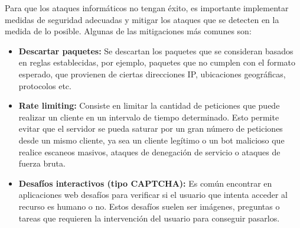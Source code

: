 Para que los ataques informáticos no tengan éxito, es importante implementar medidas de seguridad adecuadas y mitigar los ataques que se detecten en la medida de lo posible. 
Algunas de las mitigaciones más comunes son:
\begin{itemize}
	\item \textbf{Descartar paquetes:} Se descartan los paquetes que se consideran basados en reglas establecidas, por ejemplo, paquetes que no cumplen con el formato esperado, que provienen de ciertas direcciones IP, ubicaciones geográficas, protocolos etc. ~\cite{Yungaicela-Naula2022, Liu2018} 

    \item \textbf{Rate limiting:} Consiste en limitar la cantidad de peticiones que puede realizar un cliente en un intervalo de tiempo determinado. Esto permite evitar que el servidor se pueda saturar por un gran número de peticiones desde un mismo cliente, ya sea un cliente legítimo o un bot malicioso que realice escaneos masivos, ataques de denegación de servicio o ataques de fuerza bruta.

    \item \textbf{Desafíos interactivos (tipo CAPTCHA):} Es común encontrar en aplicaciones web desafíos para verificar si el usuario que intenta acceder al recurso es humano o no. Estos desafíos suelen ser imágenes, preguntas o tareas que requieren la intervención del usuario para conseguir pasarlos.
\end{itemize}